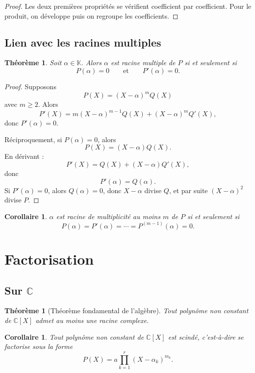 \documentclass[11pt,a4paper]{article}
\newtheorem{theoreme}[definition]{Théorème}
\newtheorem{corollaire}[definition]{Corollaire}
\theoremstyle{remark}
\newcommand{\C}{\mathbb{C}}
\newcommand{\K}{\mathbb{K}}
\begin{document}
\begin{proof}
Les deux premières propriétés se vérifient coefficient par coefficient.  
Pour le produit, on développe puis on regroupe les coefficients.
\end{proof}

\subsection{Lien avec les racines multiples}

\begin{theoreme}
Soit \(\alpha\in\K\). Alors \(\alpha\) est racine multiple de \(P\) si et seulement si
\[
P(\alpha)=0
\qquad \text{et} \qquad
P'(\alpha)=0.
\]
\end{theoreme}

\begin{proof}
Supposons
\[
P(X)=(X-\alpha)^mQ(X)
\]
avec \(m\ge 2\). Alors
\[
P'(X)=m(X-\alpha)^{m-1}Q(X)+(X-\alpha)^mQ'(X),
\]
donc \(P'(\alpha)=0\).

Réciproquement, si \(P(\alpha)=0\), alors
\[
P(X)=(X-\alpha)Q(X).
\]
En dérivant :
\[
P'(X)=Q(X)+(X-\alpha)Q'(X),
\]
donc
\[
P'(\alpha)=Q(\alpha).
\]
Si \(P'(\alpha)=0\), alors \(Q(\alpha)=0\), donc \(X-\alpha\) divise \(Q\), et par suite \((X-\alpha)^2\) divise \(P\).
\end{proof}

\begin{corollaire}
\(\alpha\) est racine de multiplicité au moins \(m\) de \(P\) si et seulement si
\[
P(\alpha)=P'(\alpha)=\cdots=P^{(m-1)}(\alpha)=0.
\]
\end{corollaire}

\section{Factorisation}

\subsection{Sur \(\C\)}

\begin{theoreme}[Théorème fondamental de l’algèbre]
Tout polynôme non constant de \(\C[X]\) admet au moins une racine complexe.
\end{theoreme}

\begin{corollaire}
Tout polynôme non constant de \(\C[X]\) est scindé, c’est-à-dire se factorise sous la forme
\[
P(X)=a\prod_{k=1}^r (X-\alpha_k)^{m_k}.
\]
\end{corollaire}
\end{document}
